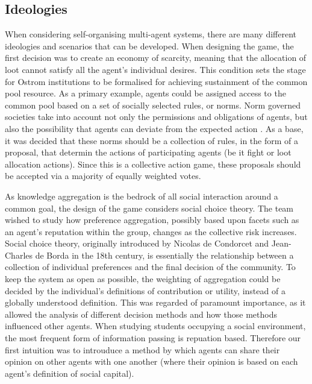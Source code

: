 \subsection{Ideologies}\label{sec: ideologies}

When considering self-organising multi-agent systems, there are many different ideologies and scenarios that can be developed. When designing the game, the first decision was to create an economy of scarcity, meaning that the allocation of loot cannot satisfy all the agent's individual desires. This condition sets the stage for Ostrom institutions to be formalised for achieving sustainment of the common pool resource. As a primary example, agents could be assigned access to the common pool based on a set of socially selected rules, or norms. Norm governed societies take into account not only the permissions and obligations of agents, but also the possibility that agents can deviate from the expected action \cite{pitt2009}. As a base, it was decided that these norms should be a collection of rules, in the form of a proposal, that determin the actions of participating agents (be it fight or loot allocation actions). Since this is a collective action game, these proposals should be accepted via a majority of equally weighted votes. 

As knowledge aggregation is the bedrock of all social interaction around a common goal, the design of the game considers social choice theory. The team wished to study how preference aggregation, possibly based upon facets such as an agent's reputation within the group, changes as the collective risk increases. Social choice theory, originally introduced by Nicolas de Condorcet and Jean-Charles de Borda in the 18th century, is essentially the relationship between a collection of individual preferences and the final decision of the community. To keep the system as open as possible, the weighting of aggregation could be decided by the individual's definitions of contribution or utility, instead of a globally understood definition. This was regarded of paramount importance, as it allowed the analysis of different decision methods and how those methods influenced other agents. When studying students occupying a social environment, the most frequent form of information passing is repuation based. Therefore our first intuition was to introuduce a method by which agents can share their opinion on other agents with one another (where their opinion is based on each agent's definition of social capital).  

